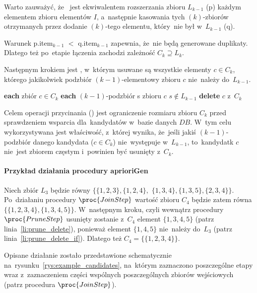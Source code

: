 Warto zauważyć, że~ jest ekwiwalentem rozszerzania zbioru $L_{k-1}$ (p) każdym elementem zbioru elementów $I$, a~następnie kasowania tych $(k)$-zbiorów otrzymanych przez dodanie $(k)$-tego elementu, który~nie był w~$L_{k-1}$ (q). 

Warunek p.item$_{k-1}$ $<$ q.item$_{k-1}$ zapewnia, że~nie będą generowane duplikaty. Dlatego też po~etapie łączenia zachodzi zależność $C_k \supseteq L_k$.

Następnym krokiem jest , w~którym usuwane są wszystkie elementy $c \in C_k$, którego jakikolwiek podzbiór $(k-1)$-elementowy zbioru $c$ nie~należy do~$L_{k-1}$.

\begin{codebox}
		\li \For \textbf{each} zbiór $c \in C_k$ 
		\li \Do
			\li \For \textbf{each} $(k-1)$-podzbiór s zbioru $c$
					\li \Do 
						\If $s \notin L_{k-1}$ \label{li:prune_delete_if}
						\li \Then
							\textbf{delete} $c$ z~$C_k$\label{li:prune_delete}
						\End
					\End
		\End
\end{codebox}

Celem operacji przycinania () jest ograniczenie rozmiaru zbioru $C_k$ przed sprawdzeniem wsparcia dla~kandydatów w~bazie danych $DB$. W~tym celu wykorzystywana jest właściwość, z~której wynika, że~jeśli jakiś $(k-1)$-podzbiór danego kandydata ($c \in C_k$) nie~występuje w~$L_{k-1}$, to~kandydatk $c$ nie~jest zbiorem częstym i~powinien być usunięty z~$C_k$.

\paragraph{Przykład działania procedury aprioriGen}
Niech zbiór $L_3$ będzie równy $\lbrace \lbrace 1, 2, 3 \rbrace, \lbrace 1,2,4 \rbrace,$ $\lbrace 1,3,4 \rbrace, \lbrace 1, 3, 5 \rbrace, \lbrace 2, 3, 4 \rbrace \rbrace$. Po~działaniu procedury $\proc{Join Step}$ wartość zbioru $C_4$ będzie zatem równa $\lbrace \lbrace 1, 2, 3, 4 \rbrace, \lbrace 1, 3, 4, 5 \rbrace \rbrace$. W~następnym kroku, czyli wewnątrz procedury $\proc{Prune Step}$ usunięty zostanie z~$C_4$ element $\lbrace 1, 3, 4, 5 \rbrace$ (patrz linia~\ref{li:prune_delete}), ponieważ element $\lbrace 1, 4, 5 \rbrace$ nie~należy do~$L_3$ (patrz linia~\ref{li:prune_delete_if}). Dlatego też $C_4 = \lbrace \lbrace 1, 2, 3, 4 \rbrace \rbrace$. 

Opisane działanie zostało przedstawione schematycznie na~rysunku~\ref{rys:example_candidates}, na~którym zaznaczono poszczególne etapy wraz z~zaznaczeniem części wspólnych poszczególnych zbiorów wejściowych (patrz procedura $\proc{Join Step}$).

